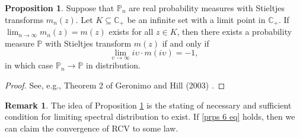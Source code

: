 \documentclass[a4paper,11pt]{book}
\theoremstyle{plain}
\theoremstyle{definition}
\newtheorem{rmrk}[thm]{Remark}
\newtheorem{prps}[thm]{Proposition}
\newcommand{\MP}{\mathbb{P}}
\begin{document}
    \begin{prps} \label{prps 6}
    	Suppose that $\mathbb{P}_n$ are real probability measures with Stieltjes transforms $m_n(z)$. Let $K \subseteq \mathbb{C}_+$ be an infinite set with a limit point in $\mathbb{C}_+$. If $\lim_{n \rightarrow \infty} m_n(z) = m(z)$ exists for all $z \in K$, then there exists a probability measure $\MP$ with Stieltjes transform $m(z)$ if and only if
    	\begin{equation} \label{prps 6 eq}
    		\lim_{\upsilon \rightarrow \infty} i\upsilon \cdot m(i \upsilon) = -1,
    	\end{equation}
    	in which case $\MP_n \rightarrow \MP$ in distribution.
    \end{prps}
    \begin{proof}
    	See, e.g., Theorem 2 of Geronimo and Hill (2003) \cite{GeronimoHill}.
    \end{proof}
    
    \begin{rmrk}
    	The idea of Proposition \ref{prps 6} is the stating of necessary and sufficient condition for limiting spectral distribution to exist. If \eqref{prps 6 eq} holds, then we can claim the convergence of RCV to some law.
    \end{rmrk}
    
\end{document}
